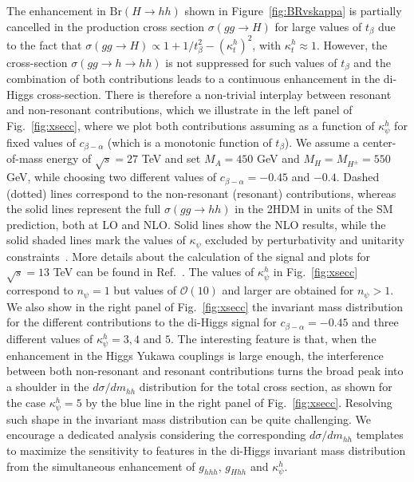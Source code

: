 The enhancement in $\text{Br}(H\to hh)$ shown in Figure~\ref{fig:BRvskappa} is partially cancelled in the production cross section $\sigma(gg\to H)$ for large values of $t_{\beta}$ due to the fact that $\sigma(gg\to H)\propto 1+1/t_\beta^2-(\kappa_t^h)^2$, with $\kappa_t^h \approx 1$. However, the cross-section $\sigma(gg\to h\to hh)$ is not suppressed for such values of $t_{\beta}$ and the combination of both contributions leads to a continuous enhancement in the di-Higgs cross-section. There is therefore a non-trivial interplay between resonant and non-resonant contributions, which we illustrate in the left panel of Fig.~\ref{fig:xsecc}, where we plot both contributions assuming as a function of $\kappa_{\psi}^h$ for fixed values of $c_{\beta-\alpha}$ (which is a monotonic function of $t_{\beta}$). We assume a center-of-mass energy of $\sqrt{s}=27$ TeV and set $M_A=450$ GeV and $M_{H}=M_{H^{\pm}}=550$ GeV, while choosing two different values of $c_{\beta-\alpha}=-0.45$ and $-0.4$. Dashed (dotted) lines correspond to the non-resonant (resonant) contributions, whereas the solid lines represent the full $\sigma(gg\to hh)$ in the 2HDM in units of the SM prediction, both at LO and NLO.   Solid lines show the NLO results, while the solid shaded lines mark the values of $\kappa_{\psi}$ excluded by perturbativity and unitarity constraints~\cite{Eriksson:2009ws}.  More details about the calculation of the signal and plots for $\sqrt{s}=13$ TeV can be found in Ref.~\cite{Bauer:2017cov}.  The values of $\kappa_{\psi}^h$ in Fig.~\ref{fig:xsecc} correspond to $n_{\psi}=1$ but values of $\mathcal{O}(10)$ and larger are obtained for $n_{\psi}>1$. We also show in the right panel of Fig.~\ref{fig:xsecc} the invariant mass distribution for the different contributions to the di-Higgs signal for $c_{\beta-\alpha}=-0.45$ and three different values of $\kappa_{\psi}^{h}=3, 4$ and $5$. The interesting feature is that, when the enhancement in the Higgs Yukawa couplings is large enough, the interference between both non-resonant and resonant contributions turns the broad peak into a shoulder in the $d\sigma/ dm_{hh}$ distribution for the total cross section, as shown for the case $\kappa_{\psi}^h=5$ by the blue line in the right panel of Fig.~\ref{fig:xsecc}. Resolving such shape in the  invariant mass distribution can be quite challenging. We encourage a dedicated analysis considering the corresponding $d\sigma/dm_{hh}$ templates to maximize the sensitivity to features in the di-Higgs invariant mass distribution from the simultaneous enhancement of  $g_{hhh}$, $g_{Hhh}$ and $\kappa^h_{\psi}$.\\

